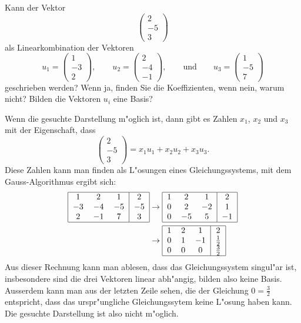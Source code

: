 Kann der Vektor
\[
\begin{pmatrix}
2\\-5\\3
\end{pmatrix}
\]
als Linearkombination der Vektoren
\[
u_1=\begin{pmatrix}
1\\-3\\2
\end{pmatrix},
\qquad
u_2=\begin{pmatrix}
2\\-4\\-1
\end{pmatrix},
\qquad\text{und}\qquad
u_3=\begin{pmatrix}
1\\-5\\7
\end{pmatrix}
\]
geschrieben werden? Wenn ja, finden Sie die Koeffizienten, wenn nein,
warum nicht? Bilden die Vektoren $u_i$ eine Basis?

\begin{loesung}
Wenn die gesuchte Darstellung m"oglich ist, dann gibt es Zahlen
$x_1$, $x_2$ und $x_3$ mit der Eigenschaft, dass
\[
\begin{pmatrix}
2\\-5\\3
\end{pmatrix}
=x_1u_1+x_2u_2+x_3u_3.
\]
Diese  Zahlen kann man finden als L"osungen eines Gleichungssystems,
mit dem Gauss-Algorithmus ergibt sich:
\begin{align*}
\begin{tabular}{|ccc|c|}
\hline
1&2&1&2\\
$-3$&$-4$&$-5$&$-5$\\
2&$-1$&7&3\\
\hline
\end{tabular}
&\rightarrow
\begin{tabular}{|ccc|c|}
\hline
1&2&1&2\\
0&2&$-2$&1\\
0&$-5$&5&$-1$\\
\hline
\end{tabular}
\\
&\rightarrow
\begin{tabular}{|ccc|c|}
\hline
1&2&1&2\\
0&1&$-1$&$\frac12$\\
0&0&0&$\frac32$\\
\hline
\end{tabular}
\end{align*}
Aus dieser Rechnung kann man ablesen, dass das Gleichungssystem singul"ar
ist, insbesondere sind die drei Vektoren linear abh"angig, bilden also
keine Basis. Ausserdem kann man aus der letzten Zeile sehen, die der
Gleichung $0=\frac32$ entspricht, dass das urspr"ungliche Gleichungssytem
keine L"osung haben kann. Die gesuchte Darstellung ist also nicht m"oglich.
\end{loesung}

